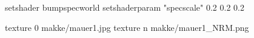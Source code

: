 setshader bumpspecworld
setshaderparam "specscale" 0.2 0.2 0.2

texture 0 makke/mauer1.jpg
texture n makke/mauer1_NRM.png
